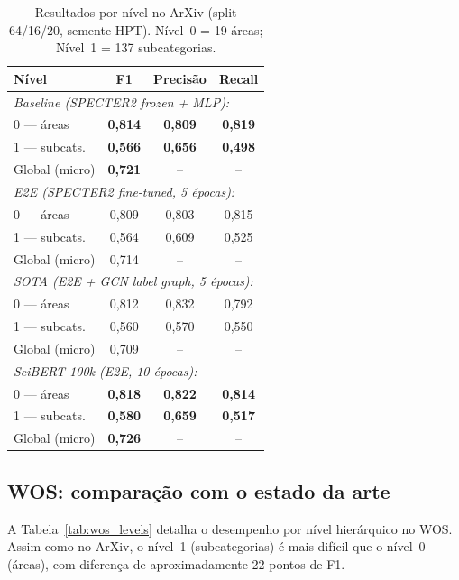 \documentclass[11pt,a4paper,twoside]{article}
\newcommand{\ours}[1]{\textcolor{ourblue}{\textbf{#1}}}
\begin{document}
\begin{table}[htbp]
\centering
\caption{Resultados por nível no ArXiv (split 64/16/20, semente HPT).
         Nível~0 = 19 áreas; Nível~1 = 137 subcategorias.}
\label{tab:arxiv_levels}
\begin{tabular}{lccc}
\toprule
\textbf{Nível} & \textbf{F1} & \textbf{Precisão} & \textbf{Recall} \\
\midrule
\multicolumn{4}{l}{\textit{Baseline (SPECTER2 frozen + MLP):}} \\
0 --- áreas      & \ours{0,814} & \ours{0,809} & \ours{0,819} \\
1 --- subcats.   & \ours{0,566} & \ours{0,656} & \ours{0,498} \\
Global (micro)   & \ours{0,721} & --              & -- \\
\midrule
\multicolumn{4}{l}{\textit{E2E (SPECTER2 fine-tuned, 5 épocas):}} \\
0 --- áreas      & 0,809 & 0,803 & 0,815 \\
1 --- subcats.   & 0,564 & 0,609 & 0,525 \\
Global (micro)   & 0,714 & --              & -- \\
\midrule
\multicolumn{4}{l}{\textit{SOTA (E2E + GCN label graph, 5 épocas):}} \\
0 --- áreas      & 0,812 & 0,832 & 0,792 \\
1 --- subcats.   & 0,560 & 0,570 & 0,550 \\
Global (micro)   & 0,709 & --              & -- \\
\midrule
\multicolumn{4}{l}{\textit{SciBERT 100k (E2E, 10 épocas):}} \\
0 --- áreas      & \ours{0,818} & \ours{0,822} & \ours{0,814} \\
1 --- subcats.   & \ours{0,580} & \ours{0,659} & \ours{0,517} \\
Global (micro)   & \ours{0,726} & --              & -- \\
\bottomrule
\end{tabular}
\end{table}

\subsection{WOS: comparação com o estado da arte}

A Tabela~\ref{tab:wos_levels} detalha o desempenho por nível hierárquico no WOS.
Assim como no ArXiv, o nível~1 (subcategorias) é mais difícil que o nível~0 (áreas),
com diferença de aproximadamente 22 pontos de F1.
\end{document}
